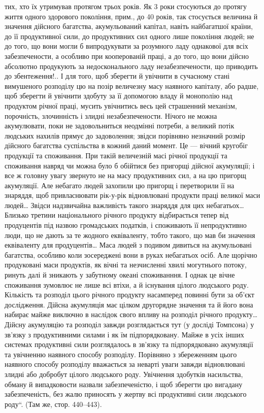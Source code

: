 \parcont{}  %
тих, хто їх утримував протягом трьох років. Як 3 роки стосуються
до протягу життя одного здорового покоління, прим., до 40 років,
так стосується величина й значення дійсного багатства, акумульований
капітал, навіть найбагатшої країни, до її продуктивної сили, до продуктивних
сил одного лише покоління людей; не до того, що вони могли б
випродукувати за розумного ладу однакової для всіх забезпечености, а
особливо при кооперованій праці, а до того, що вони дійсно абсолютно
продукують за недосконального ладу незабезпечености, що приводить до
збентеження!.. І для того, щоб зберегти й увічнити в сучасному стані вимушеного
розподілу цю на позір величезну масу наявного капіталу, або радше,
щоб зберегти й увічнити здобуту за її допомогою владу й монополію
над продуктом річної праці, мусить увічнитись весь цей страшенний
механізм, порочність, злочинність і злидні незабезпечености. Нічого не
можна акумулювати, поки не задовольниться неодмінні потреби, а великий
потік людських нахилів прямує до задоволення; звідси порівняно незначний
розмір дійсного багатства суспільства в кожний даний момент.
Це — вічний кругобіг продукції та споживання. При такій величезній масі
річної продукції та споживання навряд чи можна було б обійтися без
пригорщі дійсної акумуляції; і все ж головну увагу звернуто не на
масу продуктивних сил, а на цю пригорщ акумуляції. Але небагато
людей захопили цю пригорщ і перетворили її на знаряддя, щоб
привласнювати рік-у-рік відновлювані продукти праці великої маси людей\dots{}
Звідси надзвичайна важливість такого знаряддя для цих небагатьох\dots{}
Близько третини національного річного продукту відбирається тепер від
продуцентів під назвою громадських податків, і споживають її непродуктивно
люди, що не дають за те жодного еквіваленту, тобто такого, що
мав би значення еквіваленту для продуцентів\dots{} Маса людей з подивом
дивиться на акумульовані багатства, особливо коли зосереджені вони в
руках небагатьох осіб. Але щорічно продуковані маси продуктів, як
вічні та незчисленні хвилі могутнього потоку, ринуть далі й зникають у
забутному океані споживанння. І однак це вічне споживання зумовлює
не лише всі втіхи, а й існування цілого людського роду. Кількість та
розподіл цього річного продукту насамперед повинні бути за об’єкт дослідження.
Дійсна акумуляція має цілком другорядне значення та й його
вона набирає майже виключно в наслідок свого впливу на розподіл річного
продукту\dots{} Дійсну акумуляцію та розподіл завжди розглядається тут
(у досліді Томпсона) у зв'язку з продуктивними силами і як їм підпорядковану.
Майже в усіх інших системах продуктивні сили розглядалось
в зв’язку та підпорядковано акумуляції та увічненню наявного
способу розподілу. Порівняно з збереженням цього наявного способу
розподілу вважається за неварті уваги завжди відновлювані злидні або
добробут цілого людського роду. Увічнення здобутків насильства, обману
й випадковости назвали забезпеченістю, і щоб зберегти цю вигадану
забезпеченість, без жалю приносять у жертву всі продуктивні сили
людського роду“. (Там же, стор. 440--443).
